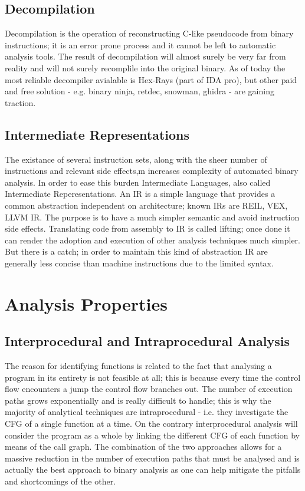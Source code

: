 \subsection{Decompilation}
Decompilation is the operation of reconstructing C-like pseudocode from binary instructions; it is an error prone
process and it cannot be left to automatic analysis tools. The result of decompilation will almost surely be very far
from reality and will not surely recomplile into the original binary. As of today the most reliable decompiler avialable
is Hex-Rays (part of IDA pro), but other paid and free solution - e.g. binary ninja, retdec, snowman, ghidra - are
gaining traction.


\subsection{Intermediate Representations}
The existance of several instruction sets, along with the sheer number of instructions and relevant side effects,m
increases complexity of automated binary analysis. In order to ease this burden Intermediate Languages, also called
Intermediate Reperesentations. An IR is a simple language that provides a common abstraction independent on
architecture; known IRs are REIL, VEX, LLVM IR. The purpose is to have a much simpler semantic and avoid instruction
side effects. Translating code from assembly to IR is called lifting; once done it can render the adoption and execution
of other analysis techniques much simpler. But there is a catch; in order to maintain this kind of abstraction IR are
generally less concise than machine instructions due to the limited syntax.



\section{Analysis Properties}


\subsection{Interprocedural and Intraprocedural Analysis}
The reason for identifying functions is related to the fact that analysing a program in its entirety is not feasible at
all; this is because every time the control flow encounters a jump the control flow branches out. The number of
execution paths grows exponentially and is really difficult to handle; this is why the majority of analytical
techniques are intraprocedural - i.e. they investigate the CFG of a single function at a time. On the contrary
interprocedural analysis will consider the program as a whole by linking the different CFG of each function by means of
the call graph. The combination of the two approaches allows for a massive reduction in the number of execution paths
that must be analysed and is actually the best approach to binary analysis as one can help mitigate the pitfalls and
shortcomings of the other.


